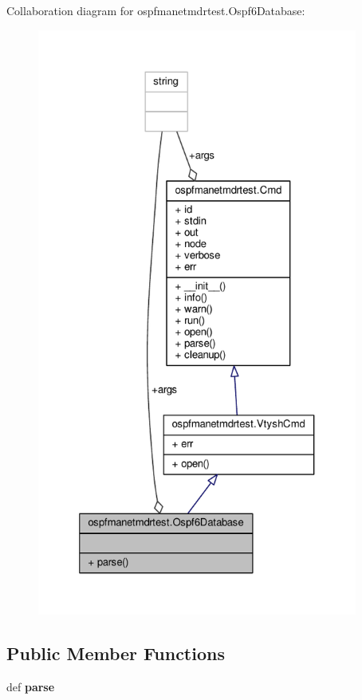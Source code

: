 Collaboration diagram for ospfmanetmdrtest.\+Ospf6\+Database\+:
\nopagebreak
\begin{figure}[H]
\begin{center}
\leavevmode
\includegraphics[height=550pt]{classospfmanetmdrtest_1_1_ospf6_database__coll__graph}
\end{center}
\end{figure}
\subsection*{Public Member Functions}
\begin{DoxyCompactItemize}
\item 
\hypertarget{classospfmanetmdrtest_1_1_ospf6_database_aa82fdbf87f93b28f9545f958b2f45e79}{def {\bfseries parse}}\label{classospfmanetmdrtest_1_1_ospf6_database_aa82fdbf87f93b28f9545f958b2f45e79}

\end{DoxyCompactItemize}
